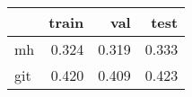 \begin{tabular}{lrrr}
\toprule
{} &  train &   val &  test \\
\midrule
mh  &  0.324 & 0.319 & 0.333 \\
git &  0.420 & 0.409 & 0.423 \\
\bottomrule
\end{tabular}
